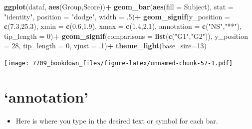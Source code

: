 \documentclass[]{book}
\newenvironment{Shaded}{\begin{snugshade}}{\end{snugshade}}
\newcommand{\DataTypeTok}[1]{\textcolor[rgb]{0.13,0.29,0.53}{#1}}
\newcommand{\DecValTok}[1]{\textcolor[rgb]{0.00,0.00,0.81}{#1}}
\newcommand{\FloatTok}[1]{\textcolor[rgb]{0.00,0.00,0.81}{#1}}
\newcommand{\KeywordTok}[1]{\textcolor[rgb]{0.13,0.29,0.53}{\textbf{#1}}}
\newcommand{\NormalTok}[1]{#1}
\newcommand{\OperatorTok}[1]{\textcolor[rgb]{0.81,0.36,0.00}{\textbf{#1}}}
\newcommand{\StringTok}[1]{\textcolor[rgb]{0.31,0.60,0.02}{#1}}
\providecommand{\tightlist}{%
  \setlength{\itemsep}{0pt}\setlength{\parskip}{0pt}}
\begin{document}
\begin{Shaded}
\begin{Highlighting}[]
\KeywordTok{ggplot}\NormalTok{(dataf, }\KeywordTok{aes}\NormalTok{(Group,Score))}\OperatorTok{+}
\StringTok{  }\KeywordTok{geom_bar}\NormalTok{(}\KeywordTok{aes}\NormalTok{(}\DataTypeTok{fill =}\NormalTok{ Subject), }\DataTypeTok{stat =} \StringTok{"identity"}\NormalTok{, }
           \DataTypeTok{position =} \StringTok{"dodge"}\NormalTok{, }\DataTypeTok{width =} \FloatTok{.5}\NormalTok{)}\OperatorTok{+}
\StringTok{  }\KeywordTok{geom_signif}\NormalTok{(}\DataTypeTok{y_position =} \KeywordTok{c}\NormalTok{(}\FloatTok{7.3}\NormalTok{,}\FloatTok{25.3}\NormalTok{), }\DataTypeTok{xmin =} \KeywordTok{c}\NormalTok{(}\FloatTok{0.6}\NormalTok{,}\FloatTok{1.9}\NormalTok{), }
              \DataTypeTok{xmax =} \KeywordTok{c}\NormalTok{(}\FloatTok{1.4}\NormalTok{,}\FloatTok{2.1}\NormalTok{), }\DataTypeTok{annotation =} \KeywordTok{c}\NormalTok{(}\StringTok{"NS"}\NormalTok{,}\StringTok{"**"}\NormalTok{),}
              \DataTypeTok{tip_length =} \DecValTok{0}\NormalTok{)}\OperatorTok{+}
\StringTok{  }\KeywordTok{geom_signif}\NormalTok{(}\DataTypeTok{comparisons =} \KeywordTok{list}\NormalTok{(}\KeywordTok{c}\NormalTok{(}\StringTok{"G1"}\NormalTok{,}\StringTok{"G2"}\NormalTok{)), }\DataTypeTok{y_position =} \DecValTok{28}\NormalTok{,}
              \DataTypeTok{tip_length =} \DecValTok{0}\NormalTok{, }\DataTypeTok{vjust =} \FloatTok{.1}\NormalTok{)}\OperatorTok{+}
\StringTok{    }\KeywordTok{theme_light}\NormalTok{(}\DataTypeTok{base_size=}\DecValTok{13}\NormalTok{)}
\end{Highlighting}
\end{Shaded}

\texttt{[image: 7709\_bookdown\_files/figure-latex/unnamed-chunk-57-1.pdf]}

\hypertarget{annotation}{%
\section{`annotation'}\label{annotation}}

\begin{itemize}
\tightlist
\item
  Here is where you type in the desired text or symbol for each bar.
\end{itemize}
\end{document}
